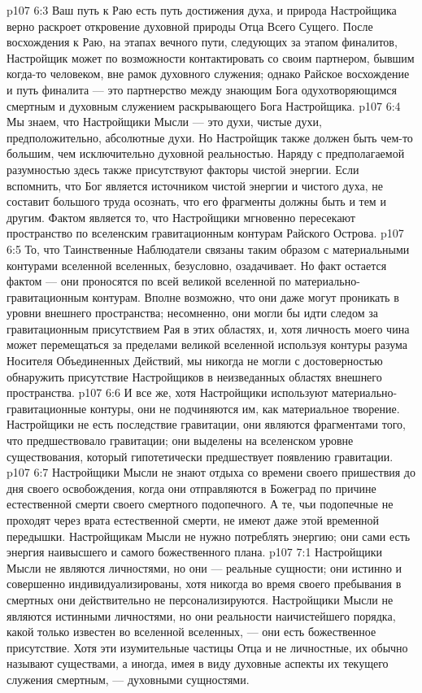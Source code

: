 \vs p107 6:3 Ваш путь к Раю есть путь достижения духа, и природа Настройщика верно раскроет откровение духовной природы Отца Всего Сущего. После восхождения к Раю, на этапах вечного пути, следующих за этапом финалитов, Настройщик может по возможности контактировать со своим партнером, бывшим когда\hyp{}то человеком, вне рамок духовного служения; однако Райское восхождение и путь финалита --- это партнерство между знающим Бога одухотворяющимся смертным и духовным служением раскрывающего Бога Настройщика.
\vs p107 6:4 \pc Мы знаем, что Настройщики Мысли --- это духи, чистые духи, предположительно, абсолютные духи. Но Настройщик также должен быть чем\hyp{}то большим, чем исключительно духовной реальностью. Наряду с предполагаемой разумностью здесь также присутствуют факторы чистой энергии. Если вспомнить, что Бог является источником чистой энергии и чистого духа, не составит большого труда осознать, что его фрагменты должны быть и тем и другим. Фактом является то, что Настройщики мгновенно пересекают пространство по вселенским гравитационным контурам Райского Острова.
\vs p107 6:5 То, что Таинственные Наблюдатели связаны таким образом с материальными контурами вселенной вселенных, безусловно, озадачивает. Но факт остается фактом --- они проносятся по всей великой вселенной по материально\hyp{}гравитационным контурам. Вполне возможно, что они даже могут проникать в уровни внешнего пространства; несомненно, они могли бы идти следом за гравитационным присутствием Рая в этих областях, и, хотя личность моего чина может перемещаться за пределами великой вселенной используя контуры разума Носителя Объединенных Действий, мы никогда не могли с достоверностью обнаружить присутствие Настройщиков в неизведанных областях внешнего пространства.
\vs p107 6:6 И все же, хотя Настройщики используют материально\hyp{}гравитационные контуры, они не подчиняются им, как материальное творение. Настройщики не есть последствие гравитации, они являются фрагментами того, что предшествовало гравитации; они выделены на вселенском уровне существования, который гипотетически предшествует появлению гравитации.
\vs p107 6:7 Настройщики Мысли не знают отдыха со времени своего пришествия до дня своего освобождения, когда они отправляются в Божеград по причине естественной смерти своего смертного подопечного. А те, чьи подопечные не проходят через врата естественной смерти, не имеют даже этой временной передышки. Настройщикам Мысли не нужно потреблять энергию; они сами есть энергия наивысшего и самого божественного плана.
\vs p107 7:1 Настройщики Мысли не являются личностями, но они --- реальные сущности; они истинно и совершенно индивидуализированы, хотя никогда во время своего пребывания в смертных они действительно не персонализируются. Настройщики Мысли не являются истинными личностями, но они  реальности наичистейшего порядка, какой только известен во вселенной вселенных, --- они есть божественное присутствие. Хотя эти изумительные частицы Отца и не личностные, их обычно называют существами, а иногда, имея в виду духовные аспекты их текущего служения смертным, --- духовными сущностями.
